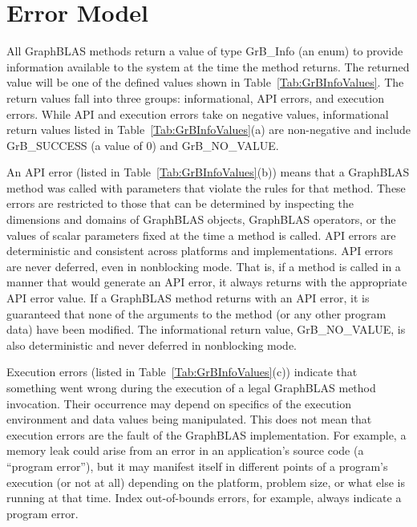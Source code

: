 \section{Error Model}
\label{Sec:ErrorModel}

All GraphBLAS methods return a value of type {\sf GrB\_Info} (an enum) to 
provide information available to the system at the time the method returns. 
The returned value will be one of the defined values shown in 
Table~\ref{Tab:GrBInfoValues}. The return values fall into three groups: 
informational, API errors, and execution errors.  While API and execution 
errors take on negative values, informational return values listed in  
Table~\ref{Tab:GrBInfoValues}(a) are non-negative and include 
{\sf GrB\_SUCCESS} (a value of 0) and {\sf GrB\_NO\_VALUE}.  

An API error (listed in Table~\ref{Tab:GrBInfoValues}(b)) means that a GraphBLAS 
method was called with parameters
that violate the rules for that method.  These errors are restricted
to those that can be determined by inspecting the dimensions and domains of
GraphBLAS objects, GraphBLAS operators, or the values of scalar parameters
fixed at the time a method is called.  API errors are deterministic and
consistent across platforms and implementations.  API errors are never
deferred, even in nonblocking mode. That is, if a method is called in
a manner that would generate an API error, it always returns with the
appropriate API error value.  If a GraphBLAS method returns with an
API error, it is guaranteed that none of the arguments to the method
(or any other program data) have been modified.  The informational return
value, {\sf GrB\_NO\_VALUE}, is also deterministic and never deferred in 
nonblocking mode.

Execution errors (listed in Table~\ref{Tab:GrBInfoValues}(c)) indicate that 
something went wrong during the execution
of a legal GraphBLAS method invocation.  Their occurrence may depend on
specifics of the execution environment and data values being manipulated.
This does not mean that execution errors are the fault of the GraphBLAS
implementation.  For example, a memory leak could arise from an error in
an application's source code (a ``program error''), but it may manifest
itself in different points of a program's execution (or not at all)
depending on the platform, problem size, or what else is running at
that time.  Index out-of-bounds errors, for example, always indicate a
program error.

